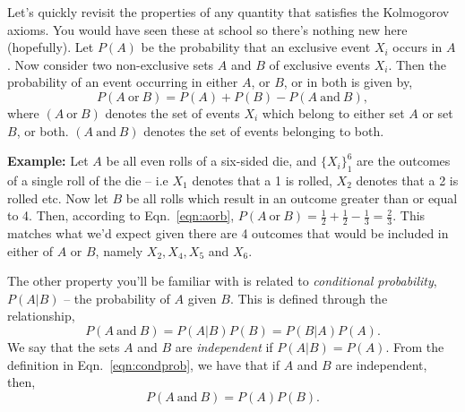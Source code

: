 Let's quickly revisit the properties of any quantity that satisfies the Kolmogorov axioms. You would have seen these at school so there's nothing new here (hopefully). Let $P(A)$ be the probability that an exclusive event $X_i$ occurs in $A$. Now consider two non-exclusive sets $A$ and $B$ of exclusive events $X_i$. Then the probability of an event occurring in either $A$, or $B$, or in both is given by, 
\begin{equation}\label{eqn:aorb}
    P(A~\mathrm{or}~B) = P(A)+P(B)-P(A~\mathrm{and}~B),
\end{equation}
where $(A~\mathrm{or}~B)$ denotes the set of events $X_i$ which belong to either set $A$ or set $B$, or both. $(A~\mathrm{and}~B)$ denotes the set of events belonging to both.  
\begin{tcolorbox}[colback=backblue]
\textbf{Example:} Let $A$  be all even rolls of a six-sided die, and $\{X_i\}_1^6$ are the outcomes of a single roll of the die -- i.e $X_1$ denotes that a 1 is rolled, $X_2$ denotes that a 2 is rolled etc. Now let $B$ be all rolls which result in an outcome greater than or equal to 4. Then, according to Eqn.~\ref{eqn:aorb},  $P(A~\mathrm{or}~B)=\frac{1}{2}+\frac{1}{2}-\frac{1}{3}=\frac{2}{3}$. This matches what we'd expect given there are 4 outcomes that would be included in either of $A$ or $B$, namely $X_2,X_4,X_5$ and $X_6$. 
\end{tcolorbox}

The other property you'll be familiar with is related to \emph{conditional probability}, $P(A|B)$ -- the probability of $A$ given $B$. This is defined through the relationship, \begin{equation}\label{eqn:condprob}
    P(A~\mathrm{and}~B) = P(A|B)P(B) = P(B|A)P(A).
\end{equation}
We say that the sets $A$ and $B$ are \emph{independent} if $P(A|B)=P(A)$. From the definition in Eqn.~\ref{eqn:condprob}, we have that if $A$ and $B$ are independent, then, 
\begin{equation}\label{eqn:paorb}
    P(A~\mathrm{and}~B) = P(A)P(B).
\end{equation}

